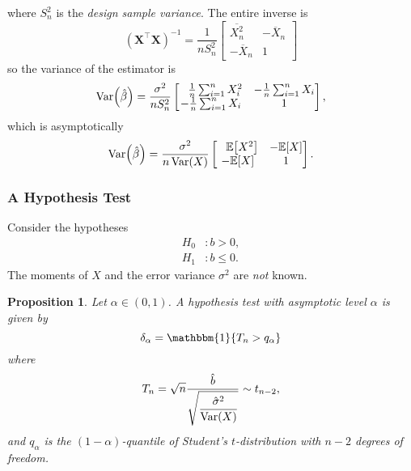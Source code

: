 \documentclass[letterpaper, reqno]{amsart}
\newtheorem{prop}{Proposition}[section]
\numberwithin{equation}{section}
\newcommand{\T}{\top} %
\newcommand{\vect}[1]{\boldsymbol{\mathbf{#1}}} %
\newcommand{\ddfrac}[2]{\frac{\displaystyle #1}{\displaystyle #2}}
\newcommand{\E}[1]{\mathbb{E}\mleft[#1\mright]}
\newcommand{\Var}[1]{\operatorname{Var}\mleft(#1\mright)}
\newcommand{\indic}[1]{\mathbbm{1}\mleft\{#1\mright\}} %
\newcommand{\sumi}[2]{\sum_{#1=1}^{#2}}
\newcommand{\avg}[2]{\frac{1}{#2}\sumi{#1}{#2}}
\newcommand{\Xnbar}{\overline{X}_n}
\newcommand{\Xsqbar}{\overline{X_n^2}}
\newcommand{\Xm}{\vect{X}}
\newcommand{\Bvh}{\hat{\beta}}
\begin{document}
where $S_n^2$ is the \emph{design sample variance}.
The entire inverse is
\[ (\Xm^\T \Xm)^{-1} = \frac{1}{n S_n^2}
  \begin{bmatrix}
    \Xsqbar & -\Xnbar \\
    -\Xnbar & 1
  \end{bmatrix}
\]
so the variance of the estimator is
{\everymath{\displaystyle}
\[ \Var{\Bvh} = \frac{\sigma^2}{n S_n^2}
  \begin{bmatrix}
    \phantom{-}\avg{i}{n} X_i^2 & -\avg{i}{n}X_i \\
    -\avg{i}{n}X_i   & 1
  \end{bmatrix},
\] which is asymptotically
\[ \Var{\Bvh} = \frac{\sigma^2}{n \Var{X}}
  \begin{bmatrix}
    \phantom{-}\E{X^2}  & -\E{X} \\
    -\E{X}              & 1
  \end{bmatrix}.
\]
}

\subsubsection{A Hypothesis Test}
Consider the hypotheses
\begin{align*}
  H_0 &\colon b > 0, \\
  H_1 &\colon b \le 0.
\end{align*}
The moments of $X$ and the error variance $\sigma^2$ are \emph{not} known.

\begin{prop}
  Let $\alpha \in (0, 1)$. A hypothesis test with asymptotic level $\alpha$ is
  given by
  \[ \delta_\alpha = \indic{T_n > q_\alpha} \]
  where
  \[ T_n = \sqrt{n}\ddfrac{\hat{b}}{\sqrt{\frac{\hat{\sigma}^2}{\Var{X}}}} \sim t_{n-2}, \]
  and $q_\alpha$ is the $(1-\alpha)$-quantile of Student's $t$-distribution
  with $n-2$ degrees of freedom.
\end{prop}
\end{document}
